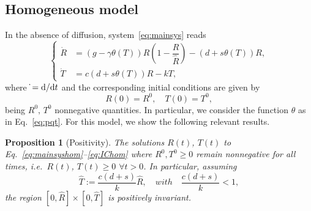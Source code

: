 \documentclass[11pt]{elsarticle}
\theoremstyle{plain}
\newtheorem{prop}[thm]{Proposition}
\theoremstyle{definition}
\theoremstyle{myremark}
\begin{document}
\subsection{Homogeneous model}
In the absence of diffusion, system~\eqref{eq:mainsys} reads
\begin{equation} \label{eq:mainsyshom}
\begin{cases}
 \dot{R}&= 
\left(g-\gamma \theta(T)\right)R\left(1-\dfrac{R}{\hat{R}}\right)
-\left(d+s\theta(T)\right)R,\\[0.3cm]
\dot{T}&= c\left(d+s\theta(T)\right)R-kT,   
\end{cases}
\end{equation}
where $\dot{}={\rm d}/{\rm d}t$ and the corresponding initial conditions are given by
\begin{equation} \label{eq:IChom}
    R(0)=R^0, \quad T(0)=T^0,
\end{equation}
being $R^0, \, T^0$ nonnegative quantities.
In particular, we consider the function $\theta$ as in Eq.~\eqref{eq:pqt}. 
For this model, we show the following relevant results.
\begin{prop}[Positivity] \label{prop:pos}
    The solutions $R(t)$, $T(t)$ to Eq.~\eqref{eq:mainsyshom}--\eqref{eq:IChom} where $R^0, T^0\geq 0$ remain nonnegative for all times, i.e.~$R(t)$, $T(t)\geq 0$ $\forall t > 0$. In particular, assuming 
    \begin{equation}
    \hat{T}:=\dfrac{c(d+s)}{k}\hat{R}, \quad with \quad \dfrac{c(d+s)}{k}<1,
\label{eq:T_hat}
\end{equation}
the region $[0, \hat{R}] \times [0, \hat{T}]$ is positively invariant. 
\end{prop}
\end{document}

